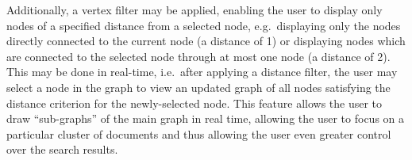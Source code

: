 Additionally, a vertex filter may be applied, enabling the user to display only nodes of a specified distance from a selected node, e.g.\ displaying only the nodes directly connected to the current node (a distance of 1) or displaying nodes which are connected to the selected node through at most one node (a distance of 2). This may be done in real-time, i.e.\ after applying a distance filter, the user may select a node in the graph to view an updated graph of all nodes satisfying the distance criterion for the newly-selected node. This feature allows the user to draw ``sub-graphs'' of the main graph in real time, allowing the user to focus on a particular cluster of documents and thus allowing the user even greater control over the search results.